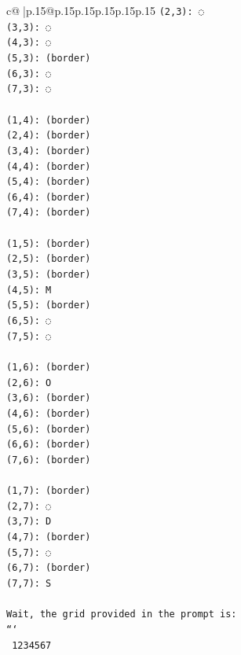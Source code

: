 \documentclass{article}
\begin{document}
{\begin{supertabular}{c@{$\;$}|p{.15\linewidth}@{}p{.15\linewidth}p{.15\linewidth}p{.15\linewidth}p{.15\linewidth}p{.15\linewidth}}
{{{\texttt{(2,3): ◌} \\
\texttt{(3,3): ◌} \\
\texttt{(4,3): ◌} \\
\texttt{(5,3): (border)} \\
\texttt{(6,3): ◌} \\
\texttt{(7,3): ◌} \\
\\ 
\texttt{(1,4): (border)} \\
\texttt{(2,4): (border)} \\
\texttt{(3,4): (border)} \\
\texttt{(4,4): (border)} \\
\texttt{(5,4): (border)} \\
\texttt{(6,4): (border)} \\
\texttt{(7,4): (border)} \\
\\ 
\texttt{(1,5): (border)} \\
\texttt{(2,5): (border)} \\
\texttt{(3,5): (border)} \\
\texttt{(4,5): M} \\
\texttt{(5,5): (border)} \\
\texttt{(6,5): ◌} \\
\texttt{(7,5): ◌} \\
\\ 
\texttt{(1,6): (border)} \\
\texttt{(2,6): O} \\
\texttt{(3,6): (border)} \\
\texttt{(4,6): (border)} \\
\texttt{(5,6): (border)} \\
\texttt{(6,6): (border)} \\
\texttt{(7,6): (border)} \\
\\ 
\texttt{(1,7): (border)} \\
\texttt{(2,7): ◌} \\
\texttt{(3,7): D} \\
\texttt{(4,7): (border)} \\
\texttt{(5,7): ◌} \\
\texttt{(6,7): (border)} \\
\texttt{(7,7): S} \\
\\ 
\texttt{Wait, the grid provided in the prompt is:} \\
\texttt{```} \\
\texttt{ 1234567} \\
}}}
\end{supertabular}}
\end{document}
